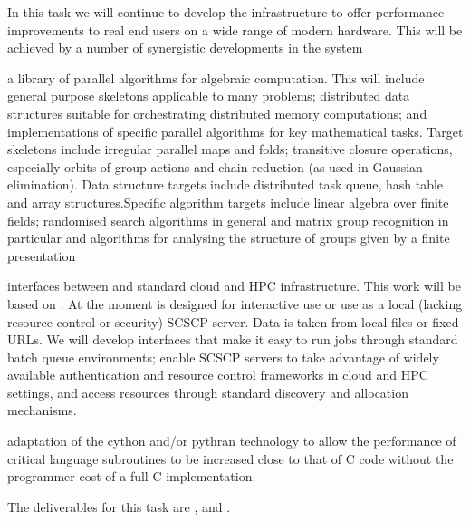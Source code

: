 \begin{workpackage}
\begin{tasklist}
\begin{task}[title=GAP,id=hpc-gap,PM=18, lead=SA, wphases={0-48!0.375}]
In this task we will continue to develop the \GAP infrastructure to
offer performance improvements to real end users on a wide range of
modern hardware. This will be achieved by a number of synergistic
developments in the system

\begin{compactitem}
\item a library of parallel algorithms for algebraic computation. This
  will include general purpose skeletons applicable to many problems;
  distributed data structures suitable for orchestrating distributed
  memory computations; and implementations of specific parallel algorithms for key
  mathematical tasks.  Target skeletons include irregular parallel
  maps and folds; transitive closure operations, especially orbits of
  group actions and chain reduction (as used in Gaussian
  elimination). Data structure targets include distributed task
  queue, hash table and array structures.Specific algorithm targets include linear algebra over
  finite fields; randomised search algorithms in general and matrix group
  recognition in particular and algorithms for analysing the structure
  of groups given by a finite presentation
\item interfaces between \GAP and standard cloud and HPC
  infrastructure. This work will be based on .
  At the moment \GAP is designed for interactive use or use as a local
  (lacking resource control or security) SCSCP server. Data is taken
  from local files or fixed URLs. We will develop
  interfaces that make it easy to run \GAP jobs through standard batch
  queue environments; enable SCSCP servers to take advantage of
  widely available authentication and resource control frameworks in
  cloud and HPC settings, and access resources through standard
  discovery and allocation mechanisms.

\item adaptation of the cython and/or pythran technology to allow the
  performance of critical \GAP language subroutines to be increased
  close to that of C code without the programmer cost of a full C implementation.
\end{compactitem}
The deliverables for this task are  ,
 and .
\end{task}



\end{tasklist}
\end{workpackage}
